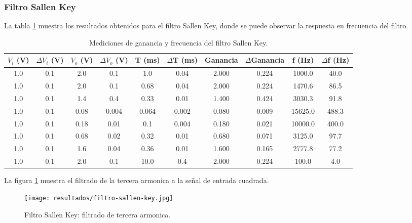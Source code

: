 \subsubsection{Filtro Sallen Key}

La tabla \ref{tab:filtro-sallen-key-ganancia-frecuencia} muestra los resultados obtenidos para el filtro Sallen Key, donde se puede observar la respuesta en frecuencia del filtro.

\begin{table}[h!]
    \centering
    \begin{tabular}{|c|c|c|c|c|c|c|c|c|c|}
        \hline
        $V_i$ (V) & $\Delta V_i$ (V) & $V_o$ (V) & $\Delta V_o$ (V) & T (ms) & $\Delta$T (ms) & Ganancia & $\Delta$Ganancia & f (Hz) & $\Delta$f (Hz) \\
        \hline
        1.0 & 0.1 & 2.0 & 0.1 & 1.0 & 0.04 & 2.000 & 0.224 & 1000.0 & 40.0 \\
        1.0 & 0.1 & 2.0 & 0.1 & 0.68 & 0.04 & 2.000 & 0.224 & 1470.6 & 86.5 \\
        1.0 & 0.1 & 1.4 & 0.4 & 0.33 & 0.01 & 1.400 & 0.424 & 3030.3 & 91.8 \\
        1.0 & 0.1 & 0.08 & 0.004 & 0.064 & 0.002 & 0.080 & 0.009 & 15625.0 & 488.3 \\
        1.0 & 0.1 & 0.18 & 0.01 & 0.1 & 0.004 & 0.180 & 0.021 & 10000.0 & 400.0 \\
        1.0 & 0.1 & 0.68 & 0.02 & 0.32 & 0.01 & 0.680 & 0.071 & 3125.0 & 97.7 \\
        1.0 & 0.1 & 1.6 & 0.04 & 0.36 & 0.01 & 1.600 & 0.165 & 2777.8 & 77.2 \\
        1.0 & 0.1 & 2.0 & 0.1 & 10.0 & 0.4 & 2.000 & 0.224 & 100.0 & 4.0 \\
        \hline
    \end{tabular}
    \caption{Mediciones de ganancia y frecuencia del filtro Sallen Key.}
    \label{tab:filtro-sallen-key-ganancia-frecuencia}
\end{table}



La figura \ref{fig:filtro-sallen-key} muestra el filtrado de la tercera armonica a la señal de entrada cuadrada.


\begin{figure}[h!]
    \centering
    \texttt{[image: resultados/filtro-sallen-key.jpg]}
    \caption{Filtro Sallen Key: filtrado de tercera armonica.}
    \label{fig:filtro-sallen-key}
\end{figure}



